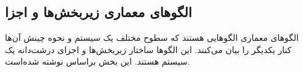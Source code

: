 \subsection{الگوهای معماری زیربخش‌ها و اجزا}
\begin{RTL}
الگوهای معماری الگوهایی هستند که سطوح مختلف یک سیستم و نحوه چینش آن‌ها کنار
یکدیگر را بیان می‌کنند. این الگوها ساختار زیربخش‌ها و اجزای درشت‌دانه یک سیستم
هستند. این بخش براساس \cite{ref4} نوشته شده‌است.
\end{RTL}








